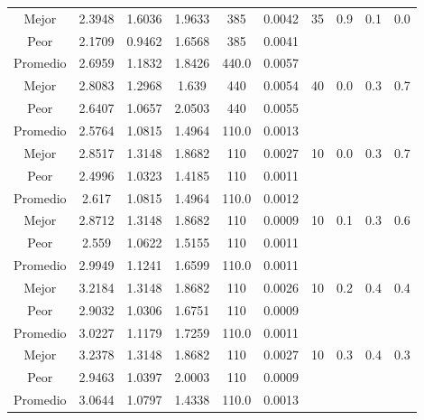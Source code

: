 \begin{table}[h!]
\begin{center}
\begin{tabular}{|c|c|c|c|c|c|c|c|c|c|}
            \cline{1-6}
            Mejor & 2.3948 & 1.6036  & 1.9633 & 385 & 0.0042 & 35 & 0.9 & 0.1 & 0.0\\
            \cline{1-6}
            Peor & 2.1709 & 0.9462  & 1.6568 & 385 & 0.0041 &  &  &  & \\
        \hline
        \hline
            Promedio  & 2.6959 & 1.1832 & 1.8426 & 440.0 & 0.0057 &  &  &  & \\
            \cline{1-6}
            Mejor & 2.8083 & 1.2968  & 1.639 & 440 & 0.0054 & 40 & 0.0 & 0.3 & 0.7\\
            \cline{1-6}
            Peor & 2.6407 & 1.0657  & 2.0503 & 440 & 0.0055 &  &  &  & \\
        \hline
        \hline
            Promedio  & 2.5764 & 1.0815 & 1.4964 & 110.0 & 0.0013 &  &  &  & \\
            \cline{1-6}
            Mejor & 2.8517 & 1.3148  & 1.8682 & 110 & 0.0027 & 10 & 0.0 & 0.3 & 0.7\\
            \cline{1-6}
            Peor & 2.4996 & 1.0323  & 1.4185 & 110 & 0.0011 &  &  &  & \\
        \hline
        \hline
            Promedio  & 2.617 & 1.0815 & 1.4964 & 110.0 & 0.0012 &  &  &  & \\
            \cline{1-6}
            Mejor & 2.8712 & 1.3148  & 1.8682 & 110 & 0.0009 & 10 & 0.1 & 0.3 & 0.6\\
            \cline{1-6}
            Peor & 2.559 & 1.0622  & 1.5155 & 110 & 0.0011 &  &  &  & \\
        \hline
        \hline
            Promedio  & 2.9949 & 1.1241 & 1.6599 & 110.0 & 0.0011 &  &  &  & \\
            \cline{1-6}
            Mejor & 3.2184 & 1.3148  & 1.8682 & 110 & 0.0026 & 10 & 0.2 & 0.4 & 0.4\\
            \cline{1-6}
            Peor & 2.9032 & 1.0306  & 1.6751 & 110 & 0.0009 &  &  &  & \\
        \hline
        \hline
            Promedio  & 3.0227 & 1.1179 & 1.7259 & 110.0 & 0.0011 &  &  &  & \\
            \cline{1-6}
            Mejor & 3.2378 & 1.3148  & 1.8682 & 110 & 0.0027 & 10 & 0.3 & 0.4 & 0.3\\
            \cline{1-6}
            Peor & 2.9463 & 1.0397  & 2.0003 & 110 & 0.0009 &  &  &  & \\
        \hline
        \hline
            Promedio  & 3.0644 & 1.0797 & 1.4338 & 110.0 & 0.0013 &  &  &  & \\

\end{tabular}
\end{center}
\end{table}
